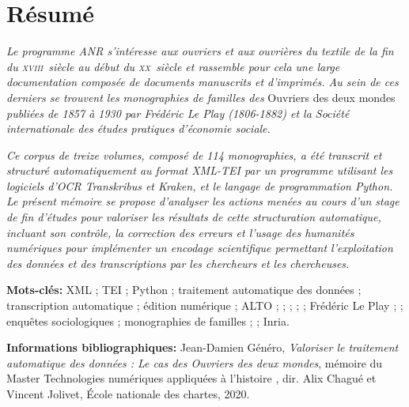 \section*{Résumé}

\bigbreak

\textit{Le programme ANR \timeus{} s’intéresse aux ouvriers et aux ouvrières du textile de la fin du \textsc{xviii}\ieme ~siècle au début du \textsc{xx}\ieme ~siècle et rassemble pour cela une large documentation composée de documents manuscrits et d'imprimés. Au sein de ces derniers se trouvent les monographies de familles des} Ouvriers des deux mondes \textit{publiées de 1857 à 1930 par Frédéric Le Play (1806-1882) et la Société internationale des études pratiques d’économie sociale.}

\textit{Ce corpus de treize volumes, composé de 114 monographies, a été transcrit et structuré automatiquement au format XML-TEI par un programme utilisant les logiciels d’OCR Transkribus et Kraken, et le langage de programmation Python. Le présent mémoire se propose d'analyser les actions menées au cours d'un stage de fin d'études pour valoriser les résultats de cette structuration automatique, incluant son contrôle, la correction des erreurs et l’usage des humanités numériques pour implémenter un encodage scientifique permettant l’exploitation des données et des transcriptions par les chercheurs et les chercheuses.}

\bigbreak

\bigbreak

\bigbreak

\textbf{Mots-clés:} XML ; TEI ; Python ; traitement automatique des données ; transcription automatique ; édition numérique ; ALTO ; \ocr ; \kraken{} ; \transkribus{} ; \gitlab{} ; Frédéric Le Play ; \lodm{} ; enquêtes sociologiques ; monographies de familles ; \timeus{} ; Inria.

\bigbreak

\bigbreak

\bigbreak

\textbf{Informations bibliographiques:} Jean-Damien Généro, \textit{Valoriser le traitement automatique des données : Le cas des Ouvriers des deux mondes}, mémoire du Master \og Technologies numériques appliquées à l'histoire \fg{}, dir. Alix Chagué et Vincent Jolivet, École nationale des chartes, 2020.

\bigbreak

\bigbreak

